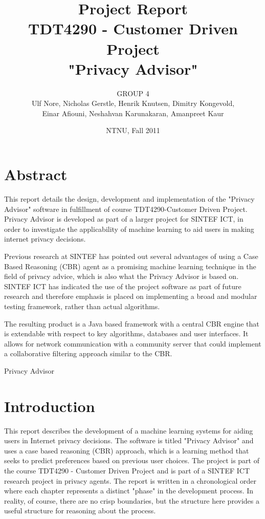 \documentclass[11pt]{book}
\title{Project Report\\
TDT4290 - Customer Driven Project \\ 
"Privacy Advisor"}
\author{GROUP 4\\
Ulf Nore, Nicholas Gerstle, Henrik Knutsen, Dimitry Kongevold,\\ 
Einar Afiouni, Neshahvan Karunakaran, Amanpreet Kaur}
\date{NTNU, Fall 2011}
\begin{document}
\dominitoc 

\frontmatter
\maketitle

\chapter*{\centering Abstract}
This report details the design, development and implementation of the
"Privacy Advisor" software in fulfillment of course TDT4290-Customer
Driven Project. Privacy Advisor is developed as part of a larger project for SINTEF ICT, in
order to investigate the applicability of machine learning to aid users in
making internet privacy decisions. 

Previous research at SINTEF has pointed
out several advantages of using a Case Based Reasoning (CBR) agent as
a promising machine learning technique in the field of privacy advice,
which is also what the Privacy Advisor is based on. SINTEF ICT
has indicated the use of the project software as part of future
research and therefore emphasis is placed on implementing a broad
and modular testing framework, rather than actual algorithms.

The resulting product is a Java based framework with a central CBR
engine that is extendable with respect to key algorithms, databases
and user interfaces. It allows for network communication with a
community server that could implement a collaborative filtering approach 
similar to the CBR.

Privacy Advisor 




\listoftables

\listoffigures

\tableofcontents \label{toc}



\chapter{Introduction}

This report describes the development of a machine learning systems for aiding users in Internet privacy decisions. The software is titled "Privacy Advisor" and uses a case based reasoning (CBR) approach, which is a learning method that seeks to predict preferences based on previous user choices. The project is part of the course TDT4290 - Customer Driven Project and is part of a SINTEF ICT research project in privacy agents. The report is written in a chronological order where each chapter represents a distinct "phase" in the development process. In reality, of course, there are no crisp boundaries, but the structure here provides a useful structure for reasoning about the process. 
\end{document}
